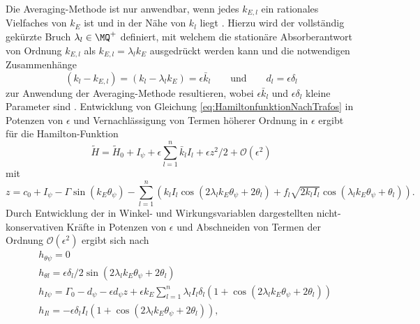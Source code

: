 		\label{subsec:TautDesignAverGleichungen}
%
%
%
Die Averaging-Methode ist nur anwendbar, wenn jedes $k_{E,l}$ ein rationales Vielfaches von $k_E$ ist und in der Nähe von $k_l$ liegt \cite{Mayet:Tautochronic}.
%
Hierzu wird der vollständig gekürzte Bruch $\lambda_l \in \MQ^+$ definiert,  
mit welchem die stationäre Absorberantwort von Ordnung $k_{E,l}$ als  $k_{E,l} = \lambda_l k_E$ ausgedrückt werden kann 
und die notwendigen Zusammenhänge 
\begin{equation}
	\left( k_l - k_{E,l} \right) = \left( k_l - \lambda_l k_E \right) = \epsilon \bar{k}_l	
					\qquad \text{und} \qquad d_l = \epsilon \delta_l
	\label{eq:AveragingNotwendigeBedingung}
\end{equation}
zur Anwendung der Averaging-Methode resultieren, wobei $\epsilon \bar{k}_l$ und $\epsilon \delta_l$ kleine Parameter sind \cite{Mayet:Tautochronic}.
%
%
%
Entwicklung von Gleichung \eqref{eq:HamiltonfunktionNachTrafos} in Potenzen von $\epsilon$ 
und Vernachlässigung von Termen höherer Ordnung in $\epsilon$ ergibt für die Hamilton-Funktion
\begin{equation}
		\tilde{H} = \tilde{H}_0 + I_{\psi} + \epsilon \sum_{l=1}^n \bar{k}_l I_l + \epsilon {z^2}/{2} + \mathcal{O}(\epsilon^2)
	\label{eq:HamiltonfunktionNachAveraging}
\end{equation}
mit
%
%
\begin{equation}
		z =  c_0 + I_{\psi} - \Gamma \sin(k_E \theta_{\psi}) 
			- \sum_{l=1}^n \left( k_l I_l \cos(2 \lambda_l k_E \theta_{\psi} + 2 \theta_l) + f_l \sqrt{2k_l I_l} \cos(\lambda_l k_E \theta_{\psi} + \theta_l) \right) .
	\label{eq:HamiltonfunktionNachAveragingDefinitionVonz}
\end{equation}
%
%
%
%
Durch Entwicklung der in Winkel- und Wirkungsvariablen dargestellten nicht-konservativen Kräfte in Potenzen von $\epsilon$
und Abschneiden von Termen der Ordnung $\mathcal{O}(\epsilon^2)$ ergibt sich nach \cite{Mayet:Tautochronic}
\begin{align}
	&h_{\theta\psi} = 0 \label{eq:NichtkonKraefteInActionAnglesGl1}\\																																	
	&h_{\theta l} = \epsilon {\delta_l}/{2} \sin(2 \lambda_l k_E \theta_{\psi} + 2 \theta_l)		\\
	&h_{I \psi} = \Gamma_0 - d_{\psi} - \epsilon d_{\psi} z + \epsilon k_E \sum_{l=1}^n \lambda_l I_l \delta_l \left( 1+ \cos(2 \lambda_l k_E \theta_{\psi} + 2 \theta_l) \right) \\
	&h_{Il} = -\epsilon \delta_l I_l \left(1+\cos (2 \lambda_l k_{E} \theta_{\psi} + 2 \theta_l) \right),
	\label{eq:NichtkonKraefteInActionAnglesGl4}
\end{align}
